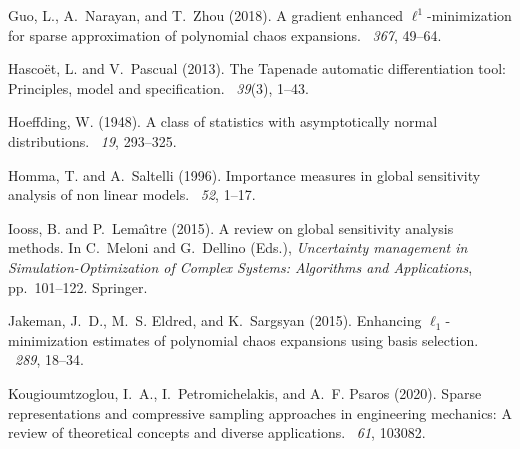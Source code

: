 \documentclass[a4paper,11pt]{article}
\theoremstyle{definition}
\theoremstyle{remark}
\theoremstyle{theorem}
\begin{document}
\begin{thebibliography}{}
	Guo, L., A.~Narayan, and T.~Zhou (2018).
	\newblock A gradient enhanced $\ell^1$-minimization for sparse approximation of
	polynomial chaos expansions.
	~{\em 367}, 49--64.
	
	Hasco\"et, L. and V.~Pascual (2013).
	\newblock The {Tapenade} automatic differentiation tool: Principles, model and
	specification.
	~{\em 39\/}(3),
	1--43.
	
	Hoeffding, W. (1948).
	\newblock A class of statistics with asymptotically normal distributions.
	~{\em 19}, 293--325.
	
	Homma, T. and A.~Saltelli (1996).
	\newblock Importance measures in global sensitivity analysis of non linear
	models.
	~{\em 52}, 1--17.
	
	Iooss, B. and P.~Lema\^{\i}tre (2015).
	\newblock A review on global sensitivity analysis methods.
	\newblock In C.~Meloni and G.~Dellino (Eds.), {\em Uncertainty management in
		Simulation-Optimization of Complex Systems: Algorithms and Applications},
	pp.\  101--122. Springer.
	
	Jakeman, J.~D., M.~S. Eldred, and K.~Sargsyan (2015).
	\newblock Enhancing {$\ell_1$}-minimization estimates of polynomial chaos
	expansions using basis selection.
	~{\em 289}, 18--34.
	
	Kougioumtzoglou, I.~A., I.~Petromichelakis, and A.~F. Psaros (2020).
	\newblock Sparse representations and compressive sampling approaches in
	engineering mechanics: {A} review of theoretical concepts and diverse
	applications.
	~{\em 61}, 103082.
	

\end{thebibliography}
\end{document}

